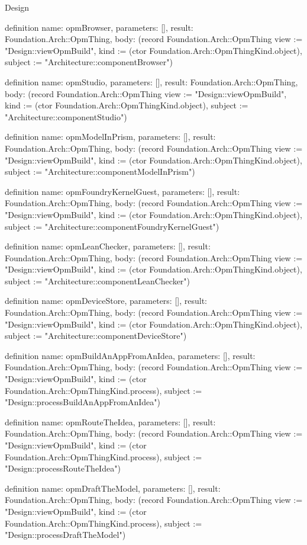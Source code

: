 \begin{lexlean}{Design}
\begin{semanticmodule}
definition{
  name: opmBrowser,
  parameters: [],
  result: Foundation.Arch::OpmThing,
  body: (record Foundation.Arch::OpmThing {view := "Design::viewOpmBuild", kind := (ctor Foundation.Arch::OpmThingKind.object), subject := "Architecture::componentBrowser"})
}

definition{
  name: opmStudio,
  parameters: [],
  result: Foundation.Arch::OpmThing,
  body: (record Foundation.Arch::OpmThing {view := "Design::viewOpmBuild", kind := (ctor Foundation.Arch::OpmThingKind.object), subject := "Architecture::componentStudio"})
}

definition{
  name: opmModelInPrism,
  parameters: [],
  result: Foundation.Arch::OpmThing,
  body: (record Foundation.Arch::OpmThing {view := "Design::viewOpmBuild", kind := (ctor Foundation.Arch::OpmThingKind.object), subject := "Architecture::componentModelInPrism"})
}

definition{
  name: opmFoundryKernelGuest,
  parameters: [],
  result: Foundation.Arch::OpmThing,
  body: (record Foundation.Arch::OpmThing {view := "Design::viewOpmBuild", kind := (ctor Foundation.Arch::OpmThingKind.object), subject := "Architecture::componentFoundryKernelGuest"})
}

definition{
  name: opmLeanChecker,
  parameters: [],
  result: Foundation.Arch::OpmThing,
  body: (record Foundation.Arch::OpmThing {view := "Design::viewOpmBuild", kind := (ctor Foundation.Arch::OpmThingKind.object), subject := "Architecture::componentLeanChecker"})
}

definition{
  name: opmDeviceStore,
  parameters: [],
  result: Foundation.Arch::OpmThing,
  body: (record Foundation.Arch::OpmThing {view := "Design::viewOpmBuild", kind := (ctor Foundation.Arch::OpmThingKind.object), subject := "Architecture::componentDeviceStore"})
}

definition{
  name: opmBuildAnAppFromAnIdea,
  parameters: [],
  result: Foundation.Arch::OpmThing,
  body: (record Foundation.Arch::OpmThing {view := "Design::viewOpmBuild", kind := (ctor Foundation.Arch::OpmThingKind.process), subject := "Design::processBuildAnAppFromAnIdea"})
}

definition{
  name: opmRouteTheIdea,
  parameters: [],
  result: Foundation.Arch::OpmThing,
  body: (record Foundation.Arch::OpmThing {view := "Design::viewOpmBuild", kind := (ctor Foundation.Arch::OpmThingKind.process), subject := "Design::processRouteTheIdea"})
}

definition{
  name: opmDraftTheModel,
  parameters: [],
  result: Foundation.Arch::OpmThing,
  body: (record Foundation.Arch::OpmThing {view := "Design::viewOpmBuild", kind := (ctor Foundation.Arch::OpmThingKind.process), subject := "Design::processDraftTheModel"})
}


\end{semanticmodule}
\end{lexlean}
